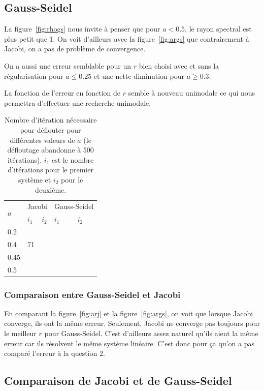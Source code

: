 \subsection{Gauss-Seidel}
La figure~\ref{fig:rhogs} nous invite à penser que pour
$a < 0.5$, le rayon spectral est plus petit que 1.
On voit d'ailleurs avec la figure~\ref{fig:args} que contrairement
à Jacobi, on a pas de problème de convergence.

On a aussi une erreur semblable pour un $r$ bien choisi
avec et sans la régularisation pour $a \leq 0.25$ et une nette
diminution pour $a \geq 0.3$.

La fonction de l'erreur en fonction de $r$ semble à nouveau unimodale
ce qui nous permettra d'effectuer une recherche unimodale.

\begin{table}
  \centering
  \begin{tabular}{|l|l|l|l|l|}
    \hline
    \multirow{2}{*}{$a$} & \multicolumn{2}{l|}{Jacobi} & \multicolumn{2}{l|}{Gauss-Seidel}\\
    \cline{2-5}
        & $i_1$ & $i_2$ & $i_1$ & $i_2$\\
    \hline
    0.2 &     &     &     & \\
    \hline
    0.4 & 71    &     &     & \\
    \hline
    0.45&   &    &     & \\
    \hline
    0.5 &    &   &    & \\
    \hline
  \end{tabular}
  \caption{Nombre d'itération nécessaire pour déflouter pour différentes valeurs de $a$ (le défloutage abandonne à 500 itérations).
  $i_1$ est le nombre d'itérations pour le premier système et $i_2$ pour le deuxième.}
  \label{tab:iter}
\end{table}

\subsubsection{Comparaison entre Gauss-Seidel et Jacobi}
En comparant la figure~\ref{fig:arj} et la figure~\ref{fig:args}, on voit
que lorsque Jacobi converge, ils ont la même erreur.
Seulement, Jacobi ne converge pas toujours pour le meilleur $r$ pour Gauss-Seidel.
C'est d'ailleurs assez naturel qu'ils aient la même erreur car ils résolvent le même
système linéaire.
C'est donc pour ça qu'on a pas comparé l'erreur à la question 2.

\subsection{Comparaison de Jacobi et de Gauss-Seidel}

